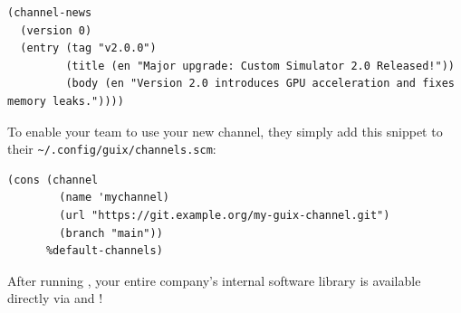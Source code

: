 \begin{lstlisting}[style=guixscheme]
(channel-news
  (version 0)
  (entry (tag "v2.0.0")
         (title (en "Major upgrade: Custom Simulator 2.0 Released!"))
         (body (en "Version 2.0 introduces GPU acceleration and fixes memory leaks."))))
\end{lstlisting}

\begin{protipbox}
To enable your team to use your new channel, they simply add this snippet to their \texttt{\textasciitilde/.config/guix/channels.scm}:
\begin{lstlisting}[style=guixscheme]
(cons (channel
        (name 'mychannel)
        (url "https://git.example.org/my-guix-channel.git")
        (branch "main"))
      %default-channels)
\end{lstlisting}
After running , your entire company's internal software library is available directly via  and !
\end{protipbox}
